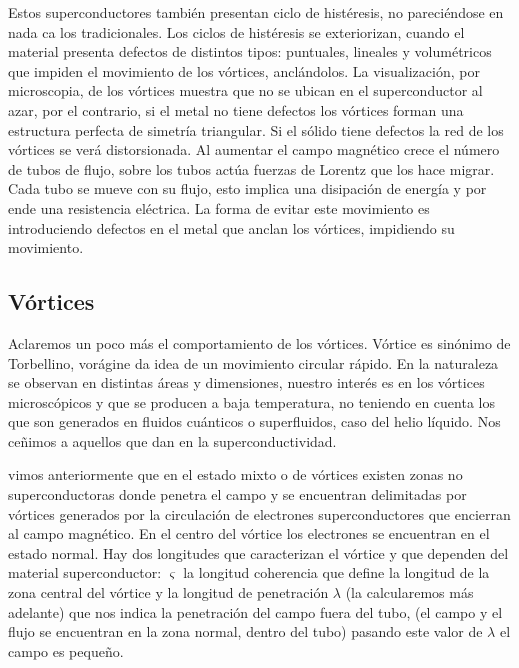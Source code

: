 Estos superconductores también presentan ciclo de histéresis, no pareciéndose en nada ca los tradicionales. Los ciclos de histéresis se exteriorizan, cuando el material presenta defectos de distintos tipos: puntuales, lineales y volumétricos que impiden el movimiento de los vórtices, anclándolos. La visualización, por microscopia, de los vórtices muestra que no se ubican en el superconductor al azar, por el contrario, si el metal no tiene defectos los vórtices forman una estructura perfecta de simetría triangular. Si el sólido tiene defectos la red de los vórtices se verá distorsionada. Al aumentar el campo magnético crece el número de tubos de flujo, sobre los tubos actúa fuerzas de Lorentz que los hace migrar. Cada tubo se mueve con su flujo, esto implica una disipación de energía y por ende una resistencia eléctrica. La forma de evitar este movimiento es introduciendo defectos en el metal que anclan los vórtices, impidiendo su movimiento.

\subsection{Vórtices}

Aclaremos un poco más el comportamiento de los vórtices. Vórtice es sinónimo de Torbellino, vorágine da idea de un movimiento circular rápido. En la naturaleza se observan en distintas áreas y dimensiones, nuestro interés es en los vórtices microscópicos y que se producen a baja temperatura, no teniendo en cuenta los que son generados en fluidos cuánticos o superfluidos, caso del helio líquido. Nos ceñimos a aquellos que dan en la superconductividad.

vimos anteriormente que en el estado mixto o de vórtices existen zonas no superconductoras donde penetra el campo y se encuentran delimitadas por vórtices generados por la circulación de electrones superconductores que encierran al campo magnético. En el centro del vórtice los electrones se encuentran en el estado normal. Hay dos longitudes que caracterizan el vórtice y que dependen del material superconductor: $\varsigma$ la longitud coherencia que define la longitud de la zona central del vórtice y la longitud de penetración $\lambda$ (la calcularemos más adelante) que nos indica la penetración del campo fuera del tubo, (el campo y el flujo se encuentran en la zona normal, dentro del tubo) pasando este valor de $\lambda$ el campo es pequeño.

